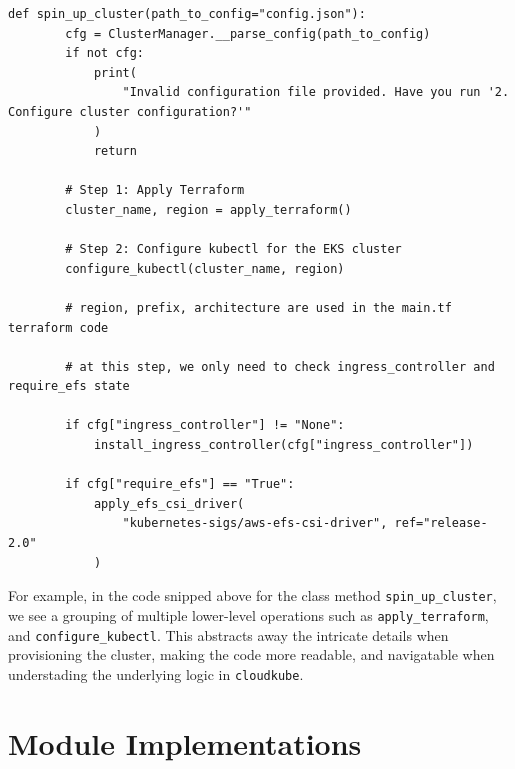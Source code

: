 \begin{lstlisting}[xleftmargin=10pt, caption={Code snippet for ClusterManager class method}]
    def spin_up_cluster(path_to_config="config.json"):
        cfg = ClusterManager.__parse_config(path_to_config)
        if not cfg:
            print(
                "Invalid configuration file provided. Have you run '2. Configure cluster configuration?'"
            )
            return

        # Step 1: Apply Terraform
        cluster_name, region = apply_terraform()

        # Step 2: Configure kubectl for the EKS cluster
        configure_kubectl(cluster_name, region)

        # region, prefix, architecture are used in the main.tf terraform code

        # at this step, we only need to check ingress_controller and require_efs state

        if cfg["ingress_controller"] != "None":
            install_ingress_controller(cfg["ingress_controller"])

        if cfg["require_efs"] == "True":
            apply_efs_csi_driver(
                "kubernetes-sigs/aws-efs-csi-driver", ref="release-2.0"
            )

\end{lstlisting}

For example, in the code snipped above for the class method \texttt{spin\_up\_cluster}, we see a grouping of multiple 
lower-level operations such as \texttt{apply\_terraform}, and \texttt{configure\_kubectl}. This abstracts away the intricate details
when provisioning the cluster, making the code more readable, and navigatable when understading the underlying logic in \texttt{cloudkube}. 

\section{Module Implementations}

